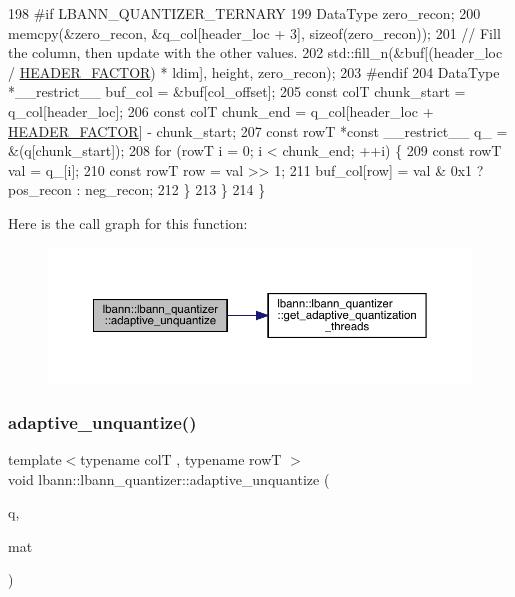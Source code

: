 \begin{DoxyCode}
198 \textcolor{preprocessor}{#if LBANN\_QUANTIZER\_TERNARY}
199     DataType zero\_recon;
200     memcpy(&zero\_recon, &q\_col[header\_loc + 3], \textcolor{keyword}{sizeof}(zero\_recon));
201     \textcolor{comment}{// Fill the column, then update with the other values.}
202     std::fill\_n(&buf[(header\_loc / \hyperlink{classlbann_1_1lbann__quantizer_afb4315625e371169cabfac56c3f75d37}{HEADER\_FACTOR}) * ldim], height, zero\_recon);
203 \textcolor{preprocessor}{#endif}
204     DataType *\_\_restrict\_\_ buf\_col = &buf[col\_offset];
205     \textcolor{keyword}{const} colT chunk\_start = q\_col[header\_loc];
206     \textcolor{keyword}{const} colT chunk\_end = q\_col[header\_loc + \hyperlink{classlbann_1_1lbann__quantizer_afb4315625e371169cabfac56c3f75d37}{HEADER\_FACTOR}] - chunk\_start;
207     \textcolor{keyword}{const} rowT *\textcolor{keyword}{const} \_\_restrict\_\_ q\_ = &(q[chunk\_start]);
208     \textcolor{keywordflow}{for} (rowT i = 0; i < chunk\_end; ++i) \{
209       \textcolor{keyword}{const} rowT val = q\_[i];
210       \textcolor{keyword}{const} rowT row = val >> 1;
211       buf\_col[row] = val & 0x1 ? pos\_recon : neg\_recon;
212     \}
213   \}
214 \}
\end{DoxyCode}
Here is the call graph for this function\+:\nopagebreak
\begin{figure}[H]
\begin{center}
\leavevmode
\includegraphics[width=350pt]{classlbann_1_1lbann__quantizer_acf8d21e8114a00fdea53d919d76dd511_cgraph}
\end{center}
\end{figure}
\mbox{\label{classlbann_1_1lbann__quantizer_a5456c31af080fce7f85aa7a01b7ee939}} 
\subsubsection{\texorpdfstring{adaptive\+\_\+unquantize()}{adaptive\_unquantize()}\hspace{0.1cm}{\footnotesize\ttfamily [2/2]}}
{\footnotesize\ttfamily template$<$typename colT , typename rowT $>$ \\
void lbann\+::lbann\+\_\+quantizer\+::adaptive\+\_\+unquantize (\begin{DoxyParamCaption}\item[{const rowT $\ast$}]{q,  }\item[{\hyperlink{base_8hpp_a0fab5387556805cfeac3e7e567bf66c5}{Dist\+Mat} \&}]{mat }\end{DoxyParamCaption})}



